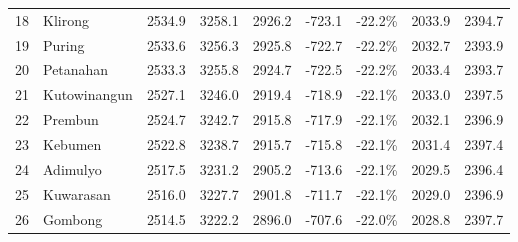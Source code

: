 \begin{table}[htbp]
{\begin{tabular}{clccccccc}
18 & Klirong & 2534.9 & 3258.1 & 2926.2 & -723.1 & -22.2\% & 2033.9 & 2394.7 \\
19 & Puring & 2533.6 & 3256.3 & 2925.8 & -722.7 & -22.2\% & 2032.7 & 2393.9 \\
20 & Petanahan & 2533.3 & 3255.8 & 2924.7 & -722.5 & -22.2\% & 2033.4 & 2393.7 \\
21 & Kutowinangun & 2527.1 & 3246.0 & 2919.4 & -718.9 & -22.1\% & 2033.0 & 2397.5 \\
22 & Prembun & 2524.7 & 3242.7 & 2915.8 & -717.9 & -22.1\% & 2032.1 & 2396.9 \\
23 & Kebumen & 2522.8 & 3238.7 & 2915.7 & -715.8 & -22.1\% & 2031.4 & 2397.4 \\
24 & Adimulyo & 2517.5 & 3231.2 & 2905.2 & -713.6 & -22.1\% & 2029.5 & 2396.4 \\
25 & Kuwarasan & 2516.0 & 3227.7 & 2901.8 & -711.7 & -22.1\% & 2029.0 & 2396.9 \\
26 & Gombong & 2514.5 & 3222.2 & 2896.0 & -707.6 & -22.0\% & 2028.8 & 2397.7 \\
\hline
\end{tabular}%
}
\end{table}
